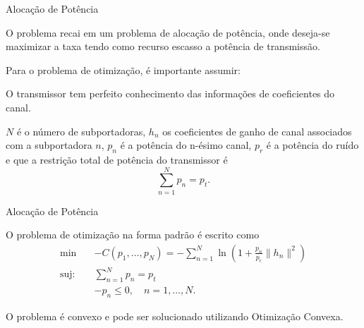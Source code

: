 \begin{frame}{Alocação de Potência}
\begin{bigitem}
   \item O problema recai em um problema de alocação de potência, onde deseja-se maximizar a taxa tendo como recurso escasso a potência de transmissão.
   \item Para o problema de otimização, é importante assumir:
   \begin{bigitem}
      \item O transmissor tem perfeito conhecimento das informações de coeficientes do canal.
      \item $N$ é o número de subportadoras, $h_n$ os coeficientes de ganho de canal associados com a subportadora $n$, $p_n$ é a potência do n-ésimo canal, $p_r$ é a potência do ruído e que a restrição total de potência do transmissor é 
      \begin{equation}\label{eq:pwr_cons}
         \sum_{n=1}^N p_n = p_t.
      \end{equation}
   \end{bigitem}
\end{bigitem}   
\end{frame}

\begin{frame}{Alocação de Potência}
   \begin{bigitem}
      \item O problema de otimização na forma padrão é escrito como
      \begin{subequations}\label{eq:cap_maxi}
        \begin{align}
          \min\quad & -C(p_1,\ldots,p_N) = -\sum_{n=1}^N \ln\left(1+\frac{p_n}{p_r}\|h_n\|^2\right)\label{seq:eff_esp}\\
            \text{suj:}\quad &\sum_{n=1}^N p_n = p_t\\
                            &-p_n \leq 0,\quad n=1,\ldots,N.
        \end{align}   
      \end{subequations}
      \item O problema é convexo e pode ser solucionado utilizando Otimização Convexa.
   \end{bigitem}
\end{frame}

